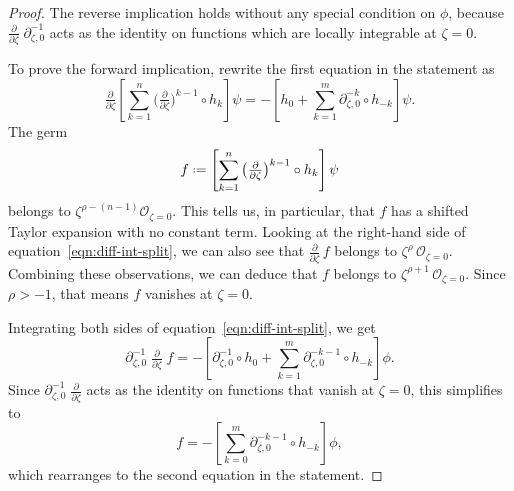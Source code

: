 \documentclass{article}
\newcommand{\fracderiv}[3]{\partial^{#1}_{#2, #3}}
\newcommand*{\defeq}{\mathrel{\vcenter{\baselineskip0.5ex \lineskiplimit0pt
                     \hbox{\scriptsize.}\hbox{\scriptsize.}}}%
                     =}
\theoremstyle{definition}
\theoremstyle{plain}
\begin{document}
\begin{proof}
The reverse implication holds without any special condition on $\phi$, because $\tfrac{\partial}{\partial \zeta}\;\fracderiv{-1}{\zeta}{0}$ acts as the identity on functions which are locally integrable at $\zeta = 0$.

To prove the forward implication, rewrite the first equation in the statement as
\begin{equation}\label{eqn:diff-int-split}
\tfrac{\partial}{\partial \zeta} \left[ \sum_{k = 1}^n \big(\tfrac{\partial}{\partial \zeta}\big)^{k-1} \circ h_k \right] \psi = -\left[ h_0 + \sum_{k = 1}^m \fracderiv{-k}{\zeta}{0} \circ h_{-k} \right] \psi.
\end{equation}
The germ
\[ f \defeq \left[ \sum_{k = 1}^n \big(\tfrac{\partial}{\partial \zeta}\big)^{k-1} \circ h_k \right] \psi \]
belongs to $\zeta^{\rho-(n-1)} \mathcal{O}_{\zeta = 0}$. This tells us, in particular, that $f$ has a shifted Taylor expansion with no constant term. Looking at the right-hand side of equation~\eqref{eqn:diff-int-split}, we can also see that $\tfrac{\partial}{\partial \zeta}\,f$ belongs to $\zeta^\rho\,\mathcal{O}_{\zeta=0}$. Combining these observations, we can deduce that $f$ belongs to $\zeta^{\rho+1}\,\mathcal{O}_{\zeta=0}$. Since $\rho > -1$, that means $f$ vanishes at $\zeta = 0$.

Integrating both sides of equation~\eqref{eqn:diff-int-split}, we get
\[ \fracderiv{-1}{\zeta}{0}\;\tfrac{\partial}{\partial \zeta}\;f = -\left[ \fracderiv{-1}{\zeta}{0} \circ h_0 + \sum_{k = 1}^m \fracderiv{-k-1}{\zeta}{0} \circ h_{-k} \right] \phi. \]
Since $\fracderiv{-1}{\zeta}{0}\;\tfrac{\partial}{\partial \zeta}$ acts as the identity on functions that vanish at $\zeta = 0$, this simplifies to
\[ f = -\left[ \sum_{k = 0}^m \fracderiv{-k-1}{\zeta}{0} \circ h_{-k} \right] \phi, \]
which rearranges to the second equation in the statement.
\end{proof}
\newpage


\end{document}
